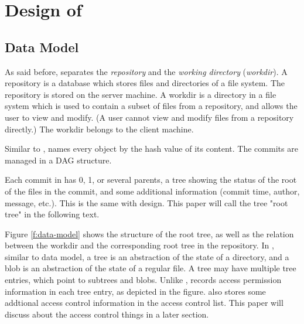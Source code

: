 \section{Design of \sys}
\label{s:design}

%


\subsection{Data Model}
\label{ss:data-model}

As said before, \sys separates the \emph{repository} and the \emph{working
directory} (\emph{workdir}). A repository is a database which stores files
and directories of a file system. The repository is stored on the server
machine. A workdir is a directory in a file system which is used to
contain a subset of files from a repository, and allows the user to view and
modify. (A user cannot view and modify files from a repository directly.) The
workdir belongs to the client machine.

Similar to \git, \sys names every object by the hash value of its content.
The commits are managed in a DAG structure.

Each commit in \sys has 0, 1, or several parents, a tree showing the status of the root of the files in the commit, and
some additional information (commit time, author, message, etc.). This is the
same with \git design. This paper will call the tree "root tree" in the
following text.



Figure \ref{f:data-model} shows the structure of the root tree, as well as the
relation between the workdir and the corresponding root tree in the repository.
In \sys, similar to \git data model, a tree is an abstraction of the state
of a directory, and a blob is an abstraction of the state of a regular file. A
tree may have multiple tree entries, which point to subtrees and blobs. Unlike
\git, \sys records access permission information in each tree entry, as depicted
in the figure. \sys also stores some addtional access control information in the
access control list. This paper will discuss about the access control things
in a later section.

